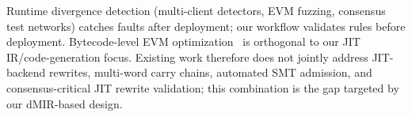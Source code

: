 {\sloppy
Runtime divergence detection (multi-client detectors, EVM fuzzing,
consensus test networks) catches faults after deployment; our workflow
validates rules before deployment.
Bytecode-level EVM
optimization~\cite{maxsmt_evm,vmil24_superinst,ist25_neural_superopt}
is orthogonal to our JIT IR/code-generation focus. Existing work
therefore does not jointly address JIT-backend rewrites, multi-word
carry chains, automated SMT admission, and consensus-critical JIT rewrite validation;
this combination is the gap targeted by our dMIR-based design.\par}

